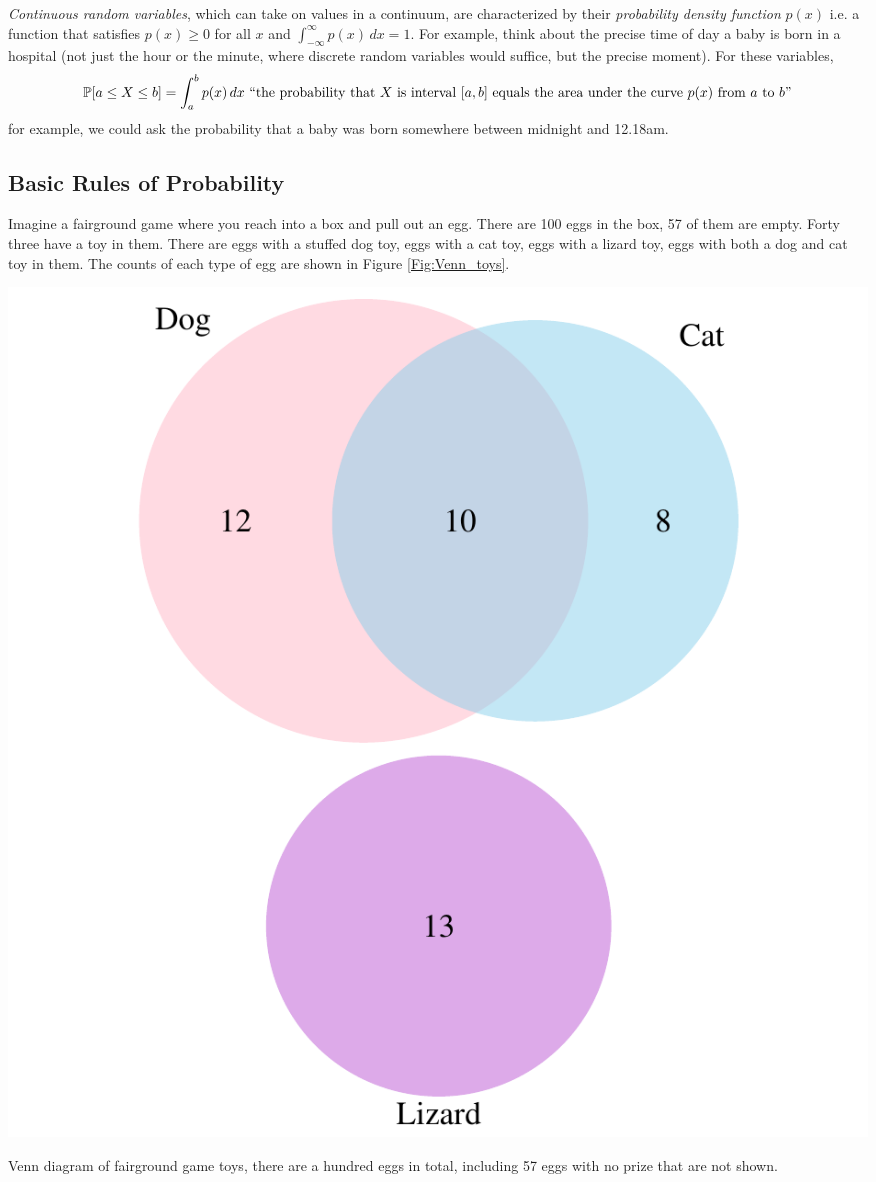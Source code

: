  \emph{Continuous random variables},  which can take on values in a continuum, are
 characterized by their  \emph{probability density function} $p(x)$
 i.e. a function that satisfies $p(x)\ge 0$ for all $x$ and
 $\int_{-\infty}^\infty p(x)\,dx =1$. For example, think about the
 precise time of day a baby
is born in a hospital (not just the hour or the minute, where discrete
random variables would suffice, but the
precise moment). For these variables, 
\[
\P[a\le X\le b] = \int_a^b p(x)\,dx \mbox{ ``the probability that $X$ is interval $[a,b]$ equals the area under the curve $p(x)$ from $a$ to $b$''}
\]
for example, we could ask the probability that a baby was born
somewhere between
midnight and 12.18am. 

\subsection{Basic Rules of Probability} \label{Section_rules_prob}
Imagine a fairground game where you reach into a box and pull out an
egg. There are 100 eggs in the box, 57 of them are empty. Forty three have a toy in them.
There are eggs with a stuffed dog toy, eggs with a cat toy, eggs with
a lizard toy, eggs with both a dog and cat toy in them. The counts of
each type of egg are shown in Figure \ref{Fig:Venn_toys}.


 \begin{marginfigure}
 \begin{center}
   \includegraphics[width=\textwidth]{math_background/dist_pics/Venn_toys.pdf}\end{center}
 \caption{Venn diagram of fairground game toys, there are a hundred
   eggs in total, including 57 eggs with no prize that are not shown. }\label{Fig:Venn_toys}
 \end{marginfigure}

